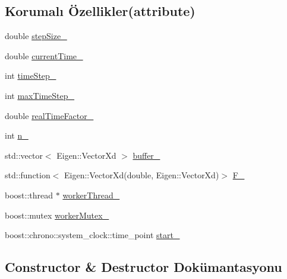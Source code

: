 \subsection*{Korumalı Özellikler(attribute)}
\begin{DoxyCompactItemize}
\item 
double \mbox{\hyperlink{classODE_1_1OdeSolverNew_a1ca38257d9d238d5e0afe568c050d397}{step\+Size\+\_\+}}
\item 
double \mbox{\hyperlink{classODE_1_1OdeSolverNew_a1b7d7ad92434fb7a3d2ecf581020e06c}{current\+Time\+\_\+}}
\item 
int \mbox{\hyperlink{classODE_1_1OdeSolverNew_af6cb50125ff1ab68003b9c3f62a6c0d2}{time\+Step\+\_\+}}
\item 
int \mbox{\hyperlink{classODE_1_1OdeSolverNew_abaaa8945496558e050fbe0e4919e5bd3}{max\+Time\+Step\+\_\+}}
\item 
double \mbox{\hyperlink{classODE_1_1OdeSolverNew_ab30a52a591310e18d7dd83d026cd10ae}{real\+Time\+Factor\+\_\+}}
\item 
int \mbox{\hyperlink{classODE_1_1OdeSolverNew_ad39a66a0929b310f32694cf048f0a041}{n\+\_\+}}
\item 
std\+::vector$<$ Eigen\+::\+Vector\+Xd $>$ \mbox{\hyperlink{classODE_1_1OdeSolverNew_abe214c99e8c6e1684c67622b2c0516b4}{buffer\+\_\+}}
\item 
std\+::function$<$ Eigen\+::\+Vector\+Xd(double, Eigen\+::\+Vector\+Xd)$>$ \mbox{\hyperlink{classODE_1_1OdeSolverNew_a953bdfee34ff013ecfb475579d8be08d}{F\+\_\+}}
\item 
boost\+::thread $\ast$ \mbox{\hyperlink{classODE_1_1OdeSolverNew_a62079063cd8a49e2b8119ffd5c37707f}{worker\+Thread\+\_\+}}
\item 
boost\+::mutex \mbox{\hyperlink{classODE_1_1OdeSolverNew_a5561c9beedfbb19cd3b1d7019cacc699}{worker\+Mutex\+\_\+}}
\item 
boost\+::chrono\+::system\+\_\+clock\+::time\+\_\+point \mbox{\hyperlink{classODE_1_1OdeSolverNew_a8afcf4e7ebd01c856a14a20ad2ca4b17}{start\+\_\+}}
\end{DoxyCompactItemize}


\subsection{Constructor \& Destructor Dokümantasyonu}
\mbox{\label{classODE_1_1OdeSolverNew_aa23301e84c4ad9534f17d0ed2ee34885}} 
